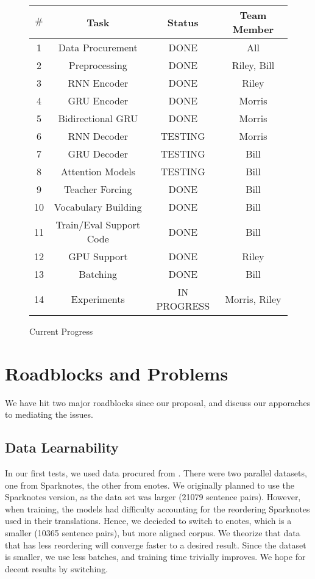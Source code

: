 \documentclass[twoside,twocolumn]{article}
\begin{document}
\begin{figure*}[ht]
    \centering
    \begin{tabular}{ |c|c|c|c| }
        \hline
        $\#$
          & \textbf{Task}
          & \textbf{Status}
          & \textbf{Team Member}\\
        \hline
        1 & Data Procurement & DONE & All \\ \hline
        2 & Preprocessing & DONE & Riley, Bill \\ \hline
        3 & RNN Encoder & DONE & Riley \\ \hline
        4 & GRU Encoder & DONE & Morris \\ \hline
        5 & Bidirectional GRU & DONE & Morris \\ \hline
        6 & RNN Decoder & TESTING & Morris \\ \hline
        7 & GRU Decoder & TESTING & Bill \\ \hline
        8 & Attention Models & TESTING & Bill \\ \hline
        9 & Teacher Forcing & DONE & Bill \\ \hline
        10 & Vocabulary Building & DONE & Bill \\ \hline
        11 & Train/Eval Support Code & DONE & Bill \\ \hline
        12 & GPU Support & DONE & Riley \\ \hline
        13 & Batching & DONE & Bill \\ \hline
        14 & Experiments & IN PROGRESS & Morris, Riley \\ \hline
    \end{tabular}

    \caption{Current Progress}
    \label{fig:current-status}
\end{figure*}


\section{Roadblocks and Problems}
We have hit two major roadblocks since our proposal, and discuss our apporaches
to mediating the issues.

\subsection{Data Learnability}
In our first tests, we used data procured from \cite{xu2012paraphrasing}.
There were two parallel datasets, one from Sparknotes, the other from enotes. We
originally planned to use the Sparknotes version, as the data set was larger
(21079 sentence pairs). However, when training, the models had difficulty
accounting for the reordering Sparknotes used in their translations. Hence, we
decieded to switch to enotes, which is a smaller (10365 sentence pairs), but
more aligned corpus. We theorize that data that has less reordering will converge
faster to a desired result. Since the dataset is smaller, we use less batches,
and training time trivially improves. We hope for decent results by switching.
\end{document}
